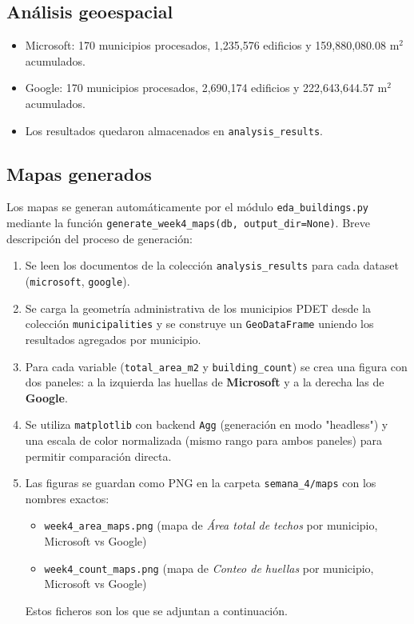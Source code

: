 \documentclass[12pt,a4paper]{article}
\begin{document}
\subsection{An\'alisis geoespacial}

\begin{itemize}
  \item Microsoft: 170 municipios procesados, 1,235,576 edificios y 159,880,080.08 m$^2$ acumulados.
  \item Google: 170 municipios procesados, 2,690,174 edificios y 222,643,644.57 m$^2$ acumulados.
  \item Los resultados quedaron almacenados en \texttt{analysis\_results}.
\end{itemize}

\subsection{Mapas generados}

Los mapas se generan automáticamente por el m\'odulo \texttt{eda\_buildings.py} mediante la funci\'on \texttt{generate\_week4\_maps(db, output\_dir=None)}.
Breve descripci\'on del proceso de generaci\'on:

\begin{enumerate}
  \item Se leen los documentos de la colecci\'on \texttt{analysis\_results} para cada dataset (\texttt{microsoft}, \texttt{google}).
  \item Se carga la geometr\'ia administrativa de los municipios PDET desde la colecci\'on \texttt{municipalities} y se construye un \texttt{GeoDataFrame} uniendo los resultados agregados por municipio.
  \item Para cada variable (\texttt{total\_area\_m2} y \texttt{building\_count}) se crea una figura con dos paneles: a la izquierda las huellas de \textbf{Microsoft} y a la derecha las de \textbf{Google}.
  \item Se utiliza \texttt{matplotlib} con backend \texttt{Agg} (generaci\'on en modo "headless") y una escala de color normalizada (mismo rango para ambos paneles) para permitir comparaci\'on directa.
  \item Las figuras se guardan como PNG en la carpeta \texttt{semana\_4/maps} con los nombres exactos:
  \begin{itemize}
    \item \texttt{week4\_area\_maps.png} (mapa de \textit{Área total de techos} por municipio, Microsoft vs Google)
    \item \texttt{week4\_count\_maps.png} (mapa de \textit{Conteo de huellas} por municipio, Microsoft vs Google)
  \end{itemize}
  Estos ficheros son los que se adjuntan a continuaci\'on.
\end{enumerate}
\end{document}
